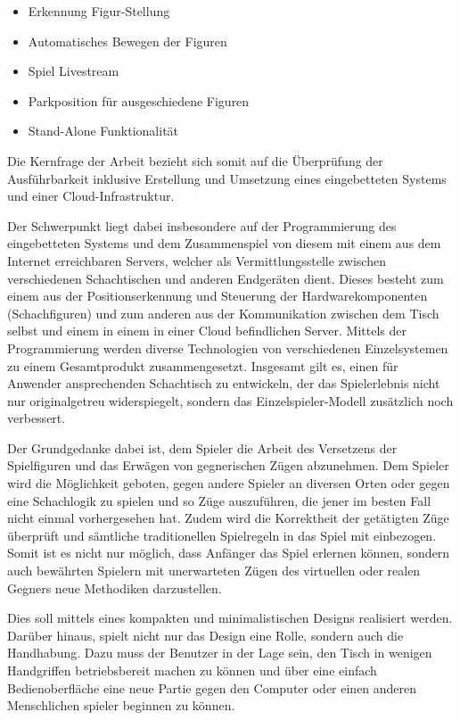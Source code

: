 \begin{itemize}
\tightlist
\item
  Erkennung Figur-Stellung
\item
  Automatisches Bewegen der Figuren
\item
  Spiel Livestream
\item
  Parkposition für ausgeschiedene Figuren
\item
  Stand-Alone Funktionalität
\end{itemize}

Die Kernfrage der Arbeit bezieht sich somit auf die Überprüfung der
Ausführbarkeit inklusive Erstellung und Umsetzung eines eingebetteten
Systems und einer Cloud-Infrastruktur.

Der Schwerpunkt liegt dabei insbesondere auf der Programmierung des
eingebetteten Systems und dem Zusammenspiel von diesem mit einem aus dem
Internet erreichbaren Servers, welcher als Vermittlungsstelle zwischen
verschiedenen Schachtischen und anderen Endgeräten dient. Dieses besteht
zum einem aus der Positionserkennung und Steuerung der
Hardwarekomponenten (Schachfiguren) und zum anderen aus der
Kommunikation zwischen dem Tisch selbst und einem in einem in einer
Cloud befindlichen Server. Mittels der Programmierung werden diverse
Technologien von verschiedenen Einzelsystemen zu einem Gesamtprodukt
zusammengesetzt. Insgesamt gilt es, einen für Anwender ansprechenden
Schachtisch zu entwickeln, der das Spielerlebnis nicht nur
originalgetreu widerspiegelt, sondern das Einzelspieler-Modell
zusätzlich noch verbessert.

Der Grundgedanke dabei ist, dem Spieler die Arbeit des Versetzens der
Spielfiguren und das Erwägen von gegnerischen Zügen abzunehmen. Dem
Spieler wird die Möglichkeit geboten, gegen andere Spieler an diversen
Orten oder gegen eine Schachlogik zu spielen und so Züge auszuführen,
die jener im besten Fall nicht einmal vorhergesehen hat. Zudem wird die
Korrektheit der getätigten Züge überprüft und sämtliche traditionellen
Spielregeln in das Spiel mit einbezogen. Somit ist es nicht nur möglich,
dass Anfänger das Spiel erlernen können, sondern auch bewährten Spielern
mit unerwarteten Zügen des virtuellen oder realen Gegners neue
Methodiken darzustellen.

Dies soll mittels eines kompakten und minimalistischen Designs
realisiert werden. Darüber hinaus, spielt nicht nur das Design eine
Rolle, sondern auch die Handhabung. Dazu muss der Benutzer in der Lage
sein, den Tisch in wenigen Handgriffen betriebsbereit machen zu können
und über eine einfach Bedienoberfläche eine neue Partie gegen den
Computer oder einen anderen Menschlichen spieler beginnen zu können.

